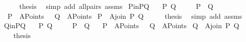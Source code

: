\begin{isabellebody}
%
\isadelimproof
%
\endisadelimproof
%
\isatagproof
{}\isamarkupfalse%
\ {\isacharminus}{\kern0pt}\isanewline
\ \ \isamarkupfalse%
\ {\isacharquery}{\kern0pt}thesis\ \isamarkupfalse%
\ {\isacharparenleft}{\kern0pt}simp\ add{\isacharcolon}{\kern0pt}\ all{\isacharunderscore}{\kern0pt}pairs\ assms{\isacharparenleft}{\kern0pt}{}{\isacharparenright}{\kern0pt}{\isacharparenright}{\kern0pt}\isanewline
{}\isamarkupfalse%
%
\endisatagproof
{\isafoldproof}%
%
\isadelimproof
\isanewline
%
\endisadelimproof
\isanewline
{}\isamarkupfalse%
\ PinPQ{}{\isacharcolon}{\kern0pt}\isanewline
\ \ \ P\ Q\isanewline
\ \ \ \ \ {\isachardoublequoteopen}P\ {\isasymnoteq}\ Q{\isachardoublequoteclose}\ \isanewline
\ {\isachardoublequoteopen}\ P\ {\isasymin}\ A{}Points{\isachardoublequoteclose}\ \ \ Q\ {\isasymin}\ A{}Points{\isachardoublequoteclose}\isanewline
{}\ {\isachardoublequoteopen}P\ {\isasymin}\ A{}join\ P\ Q{\isachardoublequoteclose}\isanewline
%
\isadelimproof
%
\endisadelimproof
%
\isatagproof
{}\isamarkupfalse%
\ {\isacharminus}{\kern0pt}\isanewline
\ \ \isamarkupfalse%
\ {\isacharquery}{\kern0pt}thesis\ \isamarkupfalse%
\ {\isacharparenleft}{\kern0pt}simp\ add{\isacharcolon}{\kern0pt}\ assms{\isacharparenleft}{\kern0pt}{}{\isacharparenright}{\kern0pt}{\isacharparenright}{\kern0pt}\isanewline
{}\isamarkupfalse%
%
\endisatagproof
{\isafoldproof}%
%
\isadelimproof
\isanewline
%
\endisadelimproof
\isanewline
{}\isamarkupfalse%
\ QinPQ{}{\isacharcolon}{\kern0pt}\isanewline
\ \ \ P\ Q\isanewline
\ \ \ \ \ {\isachardoublequoteopen}P\ {\isasymnoteq}\ Q{\isachardoublequoteclose}\ \isanewline
\ {\isachardoublequoteopen}\ P\ {\isasymin}\ A{}Points{\isachardoublequoteclose}\ \ \ Q\ {\isasymin}\ A{}Points{\isachardoublequoteclose}\isanewline
{}\ {\isachardoublequoteopen}Q\ {\isasymin}\ A{}join\ P\ Q{\isachardoublequoteclose}\isanewline
%
\isadelimproof
%
\endisadelimproof
%
\isatagproof
{}\isamarkupfalse%
\ {\isacharminus}{\kern0pt}\isanewline
\ \ \isamarkupfalse%
\ {\isacharquery}{\kern0pt}thesis\ \isamarkupfalse%

\end{isabellebody}
